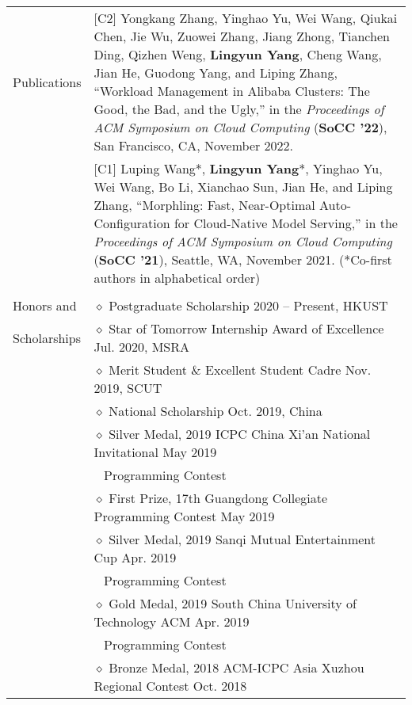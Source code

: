 \documentclass[letterpaper, 11pt]{article}
\begin{document}
\begin{longtable}{p{1in}p{5in}}
\nohyphens{Publications}
& [C2] Yongkang Zhang, Yinghao Yu, Wei Wang, Qiukai Chen, Jie Wu, Zuowei Zhang, Jiang Zhong, Tianchen Ding, Qizhen Weng, \textbf{Lingyun Yang}, Cheng Wang, Jian He, Guodong Yang, and Liping Zhang, “Workload Management in Alibaba Clusters: The Good, the Bad, and the Ugly,” in the \textit{Proceedings of ACM Symposium on Cloud Computing} (\textbf{SoCC '22}), San Francisco, CA, November 2022. \\
& [C1] Luping Wang*, \textbf{Lingyun Yang}*, Yinghao Yu, Wei Wang, Bo Li, Xianchao Sun, Jian He, and Liping Zhang, “Morphling: Fast, Near-Optimal Auto-Configuration for Cloud-Native Model Serving,” in the \textit{Proceedings of ACM Symposium on Cloud Computing} (\textbf{SoCC '21}), Seattle, WA, November 2021. (*Co-first authors in alphabetical order) \\
& \\

{Honors and }
& $\diamond$ Postgraduate Scholarship \hfill 2020 -- Present, HKUST \\
{Scholarships}
& $\diamond$ Star of Tomorrow Internship Award of Excellence \hfill Jul. 2020, MSRA \\

& $\diamond$ Merit Student \& Excellent Student Cadre \hfill Nov. 2019, SCUT \\
& $\diamond$ National Scholarship \hfill Oct. 2019, China \\

& $\diamond$ Silver Medal, 2019 ICPC China Xi'an National Invitational \hfill May 2019 \\
& $\ \ $ Programming Contest \\

& $\diamond$ First Prize, 17th Guangdong Collegiate Programming Contest \hfill May 2019 \\

& $\diamond$ Silver Medal, 2019 Sanqi Mutual Entertainment Cup \hfill Apr. 2019 \\
& $\ \ $ Programming Contest \\

& $\diamond$ Gold Medal, 2019 South China University of Technology ACM \hfill Apr. 2019 \\
& $\ \ $ Programming Contest \\

& $\diamond$ Bronze Medal, 2018 ACM-ICPC Asia Xuzhou Regional Contest \hfill Oct. 2018 \\


\end{longtable}
\end{document}
